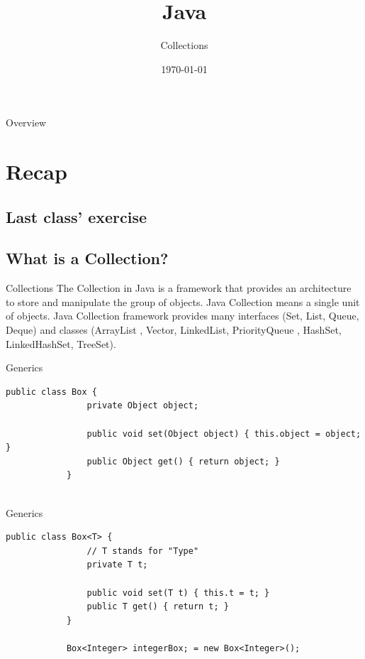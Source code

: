


\title{Java}
\subtitle{Collections}
\date{\today}


	
	\begin{frame}
		\titlepage
	\end{frame}
	
	\begin{frame}{Overview}
		\tableofcontents
	\end{frame}
	
	\section{Recap}
	\subsection{Last class' exercise}
	
	\subsection{What is a Collection?}
	\begin{frame}[fragile]{Collections}
		The Collection in Java is a framework that provides an architecture to store and manipulate the group of objects.
		Java Collection means a single unit of objects. Java Collection framework provides many interfaces (Set, List, Queue, Deque) and classes (ArrayList
		, Vector, LinkedList, PriorityQueue
		, HashSet, LinkedHashSet, TreeSet).
	\end{frame}
	
	
	\begin{frame}[fragile]{Generics}
		\begin{lstlisting}[basicstyle=\ttfamily\scriptsize]
			public class Box {
				private Object object;
				
				public void set(Object object) { this.object = object; }
				public Object get() { return object; }
			}
			
		\end{lstlisting}
	\end{frame}
	
	\begin{frame}[fragile]{Generics}
		\begin{lstlisting}[basicstyle=\ttfamily\scriptsize]
			public class Box<T> {
				// T stands for "Type"
				private T t;
				
				public void set(T t) { this.t = t; }
				public T get() { return t; }
			}
			
			Box<Integer> integerBox; = new Box<Integer>();
			
		\end{lstlisting}
	\end{frame}
	
